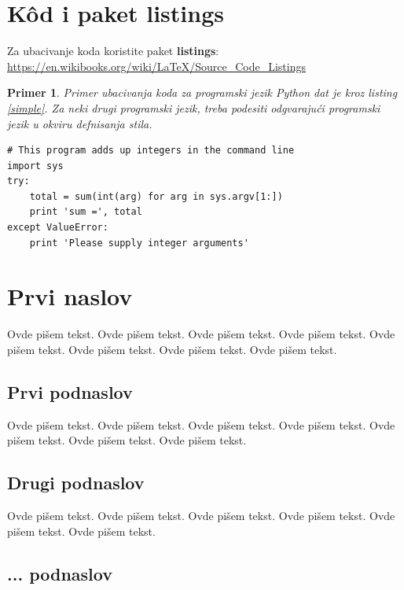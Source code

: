 \documentclass[a4paper]{article}
\newtheorem{primer}{Primer}[section]
\begin{document}
\section{K\^{o}d i paket listings}
Za ubacivanje koda koristite paket \textbf{listings}:
\url{https://en.wikibooks.org/wiki/LaTeX/Source_Code_Listings}

\begin{primer}
Primer ubacivanja koda za programski jezik Python dat je kroz listing \ref{simple}. Za neki drugi programski jezik, treba podesiti odgvarajući programski jezik u okviru defnisanja stila.
\end{primer}
\begin{lstlisting}[caption={Primer ubacivanja koda u tekst},frame=single, label=simple]
# This program adds up integers in the command line
import sys
try:
    total = sum(int(arg) for arg in sys.argv[1:])
    print 'sum =', total
except ValueError:
    print 'Please supply integer arguments'
\end{lstlisting}


\section{Prvi naslov}
\label{sec:naslov1}


Ovde pišem tekst. 
Ovde pišem tekst. 
Ovde pišem tekst. 
Ovde pišem tekst. 
Ovde pišem tekst. 
Ovde pišem tekst. 
Ovde pišem tekst. 
Ovde pišem tekst. 


\subsection{Prvi podnaslov}
\label{subsec:podnaslov1}

Ovde pišem tekst. 
Ovde pišem tekst. 
Ovde pišem tekst. 
Ovde pišem tekst. 
Ovde pišem tekst. 
Ovde pišem tekst. 
Ovde pišem tekst. 

\subsection{Drugi podnaslov}
\label{subsec:podnaslov2}

Ovde pišem tekst. 
Ovde pišem tekst. 
Ovde pišem tekst. 
Ovde pišem tekst. 
Ovde pišem tekst. 
Ovde pišem tekst. 


\subsection{... podnaslov}
\label{subsec:podnaslovN}
\end{document}
